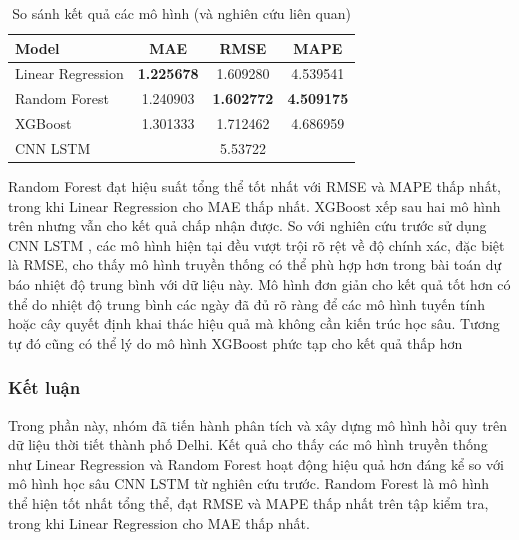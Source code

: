     \begin{table}[htbp]
        \centering
        \caption{So sánh kết quả các mô hình (và nghiên cứu liên quan)}
        \label{tab:weather-meantemp-compare}
        \begin{tabular}{|l|c|c|c|}
        \hline
        Model & MAE & RMSE & MAPE \\
        \hline
        Linear Regression & \textbf{1.225678} & 1.609280 & 4.539541 \\
        \hline
        Random Forest & 1.240903 & \textbf{1.602772} & \textbf{4.509175} \\
        \hline
        XGBoost & 1.301333 & 1.712462 & 4.686959 \\
        \hline
        CNN LSTM \cite{yunsuxiaozi} &   & 5.53722 &   \\
        \hline
        \end{tabular}
    \end{table}

    \FloatBarrier

    Random Forest đạt hiệu suất tổng thể tốt nhất với RMSE và MAPE thấp nhất, trong khi Linear Regression cho MAE thấp nhất. XGBoost xếp sau hai mô hình trên nhưng vẫn cho kết quả chấp nhận được. So với nghiên cứu trước sử dụng CNN LSTM \cite{yunsuxiaozi}, các mô hình hiện tại đều vượt trội rõ rệt về độ chính xác, đặc biệt là RMSE, cho thấy mô hình truyền thống có thể phù hợp hơn trong bài toán dự báo nhiệt độ trung bình với dữ liệu này. Mô hình đơn giản cho kết quả tốt hơn có thể do nhiệt độ trung bình các ngày đã đủ rõ ràng để các mô hình tuyến tính hoặc cây quyết định khai thác hiệu quả mà không cần kiến trúc học sâu. Tương tự đó cũng có thể lý do mô hình XGBoost phức tạp cho kết quả thấp hơn

\subsubsection{Kết luận}
    Trong phần này, nhóm đã tiến hành phân tích và xây dựng mô hình hồi quy trên dữ liệu thời tiết thành phố Delhi. Kết quả cho thấy các mô hình truyền thống như Linear Regression và Random Forest hoạt động hiệu quả hơn đáng kể so với mô hình học sâu CNN LSTM từ nghiên cứu trước. Random Forest là mô hình thể hiện tốt nhất tổng thể, đạt RMSE và MAPE thấp nhất trên tập kiểm tra, trong khi Linear Regression cho MAE thấp nhất.